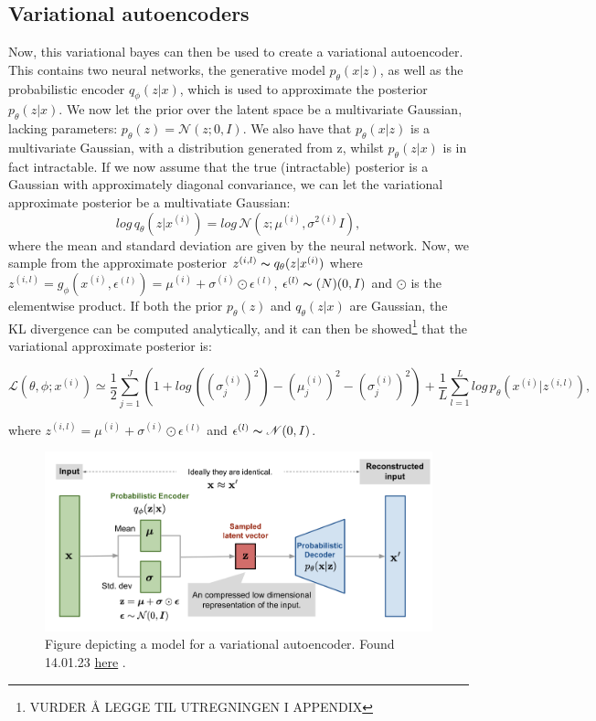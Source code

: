 \subsection*{Variational autoencoders}
Now, this variational bayes can then be used to create a variational autoencoder. This contains two neural networks, the generative model $p_{\theta}(x|z)$,
as well as the probabilistic encoder $q_{\phi}(z|x)$, which is used to approximate the posterior $p_{\theta}(z|x)$. We now let the prior over 
the latent space be a multivariate Gaussian, lacking parameters: $p_{\theta}(z) = \mathcal{N}(z;0,I)$. We also have that $p_{\theta}(x|z)$ is a multivariate Gaussian,
with a distribution generated from z, whilst $p_{\theta}(z|x)$ is in fact intractable. If we now assume that the true (intractable) posterior 
is a Gaussian with approximately diagonal convariance, we can let the variational approximate posterior be a multivatiate Gaussian:
\begin{equation}
    log\, q_{\theta}(z|x^{(i)}) = log\, \mathcal{N}(z;\mu^{(i)},\sigma^{2(i)}I),
\end{equation}
where the mean and standard deviation are given by the neural network. Now, we sample from the approximate posterior $z^{(i,l)} \thicksim q_{\theta}(z|x^{(i)})$
where $z^{(i,l)} = g_{\phi}(x^{(i)}, \epsilon^{(l)}) = \mu^{(i)} + \sigma^{(i)} \odot \epsilon^{(l)}$, $\epsilon^{(l)} \thicksim \mathcal(N)(0,I)$ and $\odot$
is the elementwise product. If both the prior $p_{\theta}(z)$ and $q_{\theta}(z|x)$ are Gaussian, the KL divergence can be computed analytically, and it 
can then be showed\footnote{VURDER Å LEGGE TIL UTREGNINGEN I APPENDIX}\cite{VAE} that the variational approximate posterior is:

\begin{equation}\label{eq:loss_vae}
    \mathcal{L}(\theta, \phi;x^{(i)}) \simeq \frac{1}{2}\sum_{j=1}^{J}(1 + log\, ((\sigma^{(i)}_{j})^2) - (\mu^{(i)}_{j})^2 - (\sigma^{(i)}_{j})^2) +\frac{1}{L}\sum_{l=1}^{L}log\, p_{\theta}(x^{(i)}|z^{(i,l)}),
\end{equation}

where $z^{(i,l)} = \mu^{(i)} + \sigma^{(i)} \odot \epsilon^{(l)}$ and $ \epsilon^{(l)} \thicksim \mathcal{N}(0,I)$.

\begin{figure}[h!]
    \includegraphics[width=\linewidth]{Figures/Machinelearning/vae-gaussian.png}
    \caption{Figure depicting a model for a variational autoencoder. Found 14.01.23 \href{https://lilianweng.github.io/posts/2018-08-12-vae/vae-gaussian.png}{here} \cite{weng2018VAE}. }
    \label{fig:vae}
\end{figure}

